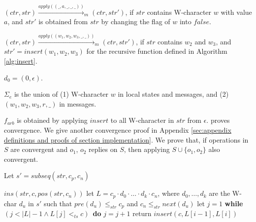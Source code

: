{\begin{itemize}
{\item[-] $(\mathit{ctr},\mathit{str}) \xrightarrow{\mathit{apply}((\_,a,\_,\_,\_))}_m (\mathit{ctr},\mathit{str}')$, if $\mathit{str}$ contains W-character $w$ with value $a$, and $\mathit{str}'$ is obtained from $\mathit{str}$ by changing the flag of $w$ into $\mathit{false}$.

\item[-] $(\mathit{ctr},\mathit{str}) \xrightarrow{\mathit{apply}((w_1,w_2,w_3,\_,\_))}_m (\mathit{ctr},\mathit{str}')$, if $\mathit{str}$ contains $w_2$ and $w_3$, and $\mathit{str}' = \mathit{insert}(w_1,w_2,w_3)$ for the recursive function defined in Algorithm \ref{alg:insert}.
}

\item[-] $d_0 = (0,\epsilon)$.

\item[-] $\Sigma_e$ is the union of (1) W-character $w$ in local states and messages, and (2) $(w_1,w_2,w_3,r,\_)$ in messages.

\item[-] {\color {red}$f_{arb}$ is obtained by applying $\mathit{insert}$ to all W-character in $\mathit{str}$ from $\epsilon$. \cite{Oster:2006} proves convergence. We give another convergence proof in Appendix \ref{sec:appendix definitions and proofs of section implementation}. We prove that, if operations in $S$ are convergent and $o_1$, $o_2$ replies on $S$, then applying $S \cup \{ o_1,o_2 \}$ also convergent.}



\end{itemize}

\begin{algorithm}[t]

Let $s' = \mathit{subseq}(\mathit{str},c_p,c_n)$ \;

{
    \Return $\mathit{ins}(\mathit{str},c,\mathit{pos}(\mathit{str},c_n))$\;
}
\Else
{
    let $L = c_p \cdot d_0 \cdot \ldots \cdot d_k \cdot c_n$, where $d_0,\ldots,d_k$ are the W-char $d_u$ in $s'$ such that $\mathit{pre}(d_u) \leq_{\mathit{str}} c_p$ and $c_n \leq_{\mathit{str}} \mathit{next}(d_u)$\;
    let $j = 1$\;
    {\bf while} $(j < \vert L \vert -1 \wedge L[j] <_{\mathit{ts}} c)$\ {\bf do}
    {
        $j = j+1$\;
    }
    return $\mathit{insert}(c,L[i-1],L[i])$\;
}
\caption{$\mathit{insert}$}
\label{alg:insert}
\end{algorithm}
}










